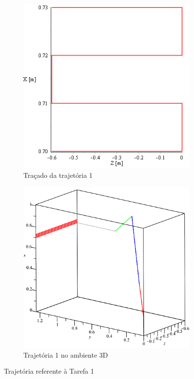 \begin{figure}[h]
    \centering
    \begin{subfigure}[b]{0.45\textwidth}
        \includegraphics[width=\textwidth]{figs/traj1}
        \caption{Traçado da trajetória 1}
        \label{fig::traj1}
    \end{subfigure}
    \quad %
    \begin{subfigure}[b]{0.49\textwidth}
        \includegraphics[width=\textwidth]{figs/traj1_3d}
        \caption{Trajetória 1 no ambiente 3D}
        \label{fig::traj1_3d}
    \end{subfigure}
    \caption{Trajetória referente à Tarefa 1}
    \label{fig::traj1_subf}
\end{figure}

